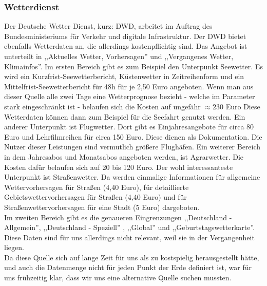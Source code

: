 \subsubsection*{Wetterdienst} %
Der Deutsche Wetter Dienst, kurz: DWD, arbeitet im Auftrag des Bundesministeriums für Verkehr und digitale Infrastruktur. \cite{bmvi}
Der DWD bietet ebenfalls Wetterdaten an, die allerdings kostenpflichtig sind.
Das Angebot ist unterteilt in ,,Aktuelles Wetter, Vorhersagen'' und ,,Vergangenes Wetter, Klimainfos''.
Im ersten Bereich gibt es zum Beispiel den Unterpunkt Seewetter.
Es wird ein Kurzfrist-Seewetterbericht, Küstenwetter in Zeitreihenform und ein Mittelfrist-Seewetterbericht für 48h für je 2,50 Euro angeboten.
Wenn man aus dieser Quelle alle zwei Tage eine Wetterprognose bezieht - welche im Parameter stark eingeschränkt ist - belaufen sich die Kosten auf ungefähr $\approx 230$ Euro Diese Wetterdaten können dann zum Beispiel für die Seefahrt genutzt werden.
Ein anderer Unterpunkt ist Flugwetter.
Dort gibt es Einjahresangebote für circa 80 Euro und Lehrfilmreihen für circa 150 Euro.
Diese dienen als Dokumentation.
Die Nutzer dieser Leistungen sind vermutlich größere Flughäfen.
Ein weiterer Bereich in dem Jahresabos und Monatsabos angeboten werden, ist Agrarwetter.
Die Kosten dafür belaufen sich auf 20 bis 120 Euro.
Der wohl interessanteste Unterpunkt ist Straßenwetter.
Da werden einmalige Informationen für allgemeine Wettervorhersagen für Straßen (4,40 Euro),
für detaillierte Gebietswettervorhersagen für Straßen (4,40 Euro) und für Straßenwettervorhersagen für eine Stadt (5 Euro) dargeboten.\\
Im zweiten Bereich gibt es die genaueren Eingrenzungen ,,Deutschland - Allgemein'', ,,Deutschland - Speziell'' , ,,Global'' und ,,Geburtstagswetterkarte''.
\cite{dwd-shop}
Diese Daten sind für uns allerdings nicht relevant, weil sie in der Vergangenheit liegen.\\
Da diese Quelle sich auf lange Zeit für uns als zu kostspielig herausgestellt hätte,
und auch die Datenmenge nicht für jeden Punkt der Erde definiert ist,
war für uns frühzeitig klar, dass wir uns eine alternative Quelle suchen mussten.

